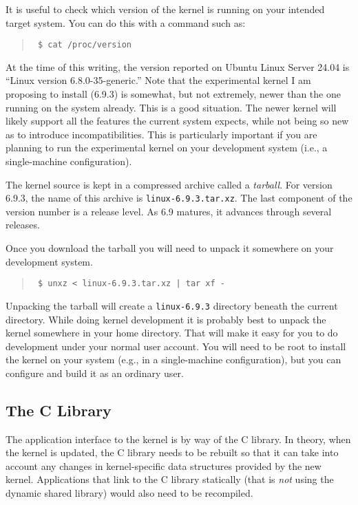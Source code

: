 \documentclass{article}
\newcommand{\filename}[1]{\texttt{#1}}
\newcommand{\newterm}[1]{\textit{#1}}
\newenvironment{commands}
  {\begin{quote} \tt}
  {\end{quote}}
\begin{document}
It is useful to check which version of the kernel is running on your intended target system. You
can do this with a command such as:

\begin{commands}
  \$ cat /proc/version
\end{commands}

At the time of this writing, the version reported on Ubuntu Linux Server 24.04 is ``Linux
version 6.8.0-35-generic.'' Note that the experimental kernel I am proposing to install (6.9.3)
is somewhat, but not extremely, newer than the one running on the system already. This is a good
situation. The newer kernel will likely support all the features the current system expects,
while not being so new as to introduce incompatibilities. This is particularly important if you
are planning to run the experimental kernel on your development system (i.e., a single-machine
configuration).

The kernel source is kept in a compressed archive called a \newterm{tarball}. For version 6.9.3,
the name of this archive is \filename{linux-6.9.3.tar.xz}. The last component of the version
number is a release level. As 6.9 matures, it advances through several releases.

Once you download the tarball you will need to unpack it somewhere on your development system.

\begin{commands}
  \$ unxz < linux-6.9.3.tar.xz | tar xf -
\end{commands}

Unpacking the tarball will create a \filename{linux-6.9.3} directory beneath the current
directory. While doing kernel development it is probably best to unpack the kernel somewhere in
your home directory. That will make it easy for you to do development under your normal user
account. You will need to be root to install the kernel on your system (e.g., in a
single-machine configuration), but you can configure and build it as an ordinary user.

\subsection{The C Library}

The application interface to the kernel is by way of the C library. In theory, when the kernel
is updated, the C library needs to be rebuilt so that it can take into account any changes in
kernel-specific data structures provided by the new kernel. Applications that link to the C
library statically (that is \emph{not} using the dynamic shared library) would also need to be
recompiled.
\end{document}
